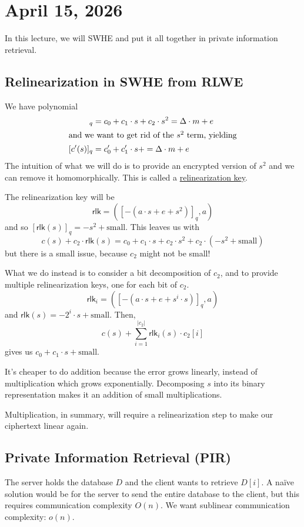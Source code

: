 \section{April 15, 2026}
\label{20260415}

In this lecture, we will SWHE and put it all together in private information retrieval.

\subsection{Relinearization in SWHE from RLWE}
We have polynomial
\begin{align*}
    [c(s)]_q  & = c_0 + c_1\cdot s + c_2\cdot s^2 = \Delta \cdot m + e \\
    \intertext{and we want to get rid of the $s^2$ term, yielding}
    [c'(s)]_q & = c_0' + c_1'\cdot s + = \Delta \cdot m + e
\end{align*}
The intuition of what we will do is to provide an encrypted version of $s^2$ and we can remove it homomorphically. This is called a \ul{relinearization key}.

The relinearization key will be
\[\mathsf{rlk} = \left( [-(a\cdot s + e + s^2)]_q, a \right)\]
and so $[\mathsf{rlk}(s)]_q = -s^2 + \text{small}$. This leaves us with
\[c(s) + c_2 \cdot \mathsf{rlk}(s) = c_0 + c_1\cdot s + c_2\cdot s^2 + c_2\cdot (-s^2 + \text{small})\]
but there is a small issue, because $c_2$ might not be small!

What we do instead is to consider a bit decomposition of $c_2$, and to provide multiple relinearization keys, one for each bit of $c_2$.
\[\mathsf{rlk}_i = ([-(a\cdot s + e + s^i\cdot s)]_q, a)\]
and $\mathsf{rlk}(s) = -2^i\cdot s + \text{small}$. Then,
\[c(s) + \sum^{|c_2|}_{i=1}\mathsf{rlk}_i(s)\cdot c_2[i]\]
gives us $c_0 + c_1\cdot s + \text{small}$.

It's cheaper to do addition because the error grows linearly, instead of multiplication which grows exponentially. Decomposing $s$ into its binary representation makes it an addition of small multiplications.

Multiplication, in summary, will require a relinearization step to make our ciphertext linear again.

\subsection{Private Information Retrieval (PIR)}

The server holds the database $D$ and the client wants to retrieve $D[i]$. A na\"ive solution would be for the server to send the entire database to the client, but this requires communication complexity $O(n)$. We want sublinear communication complexity: $o(n)$.

